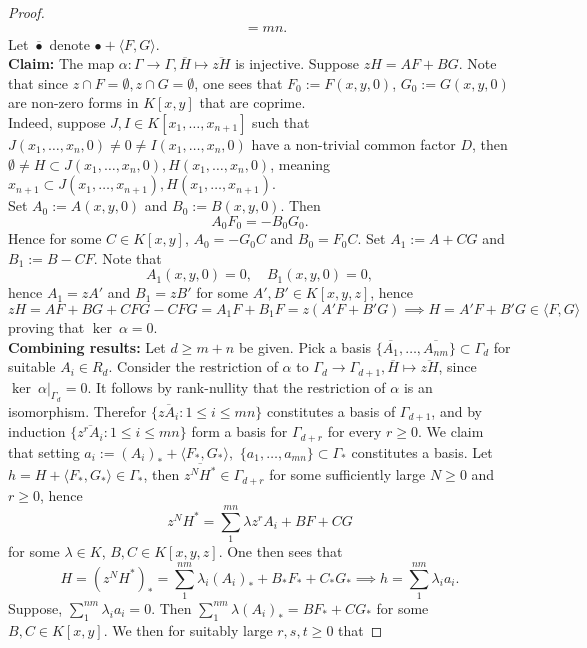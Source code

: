 \begin{proof}
\begin{align*}
            &= mn.
        \end{align*}
        Let $\overline{\bullet}$ denote $\bullet + \langle F,G\rangle$.\\
        \textbf{Claim:} The map $\alpha : \Gamma\rightarrow \Gamma, \overline{H} \mapsto \overline{zH}$ is injective. Suppose $zH=AF+BG$. Note that since $z\cap F = \emptyset,z\cap G = \emptyset$, one sees that $F_0:=F(x,y,0)$, $G_0:=G(x,y,0)$ are non-zero forms in $K[x,y]$ that are coprime.\\
        Indeed, suppose $J,I\in K[x_1,\dots,x_{n+1}]$ such that $J(x_1,\dots,x_n,0)\neq 0 \neq I(x_1,\dots,x_n,0)$ have a non-trivial common factor $D$, then $\emptyset\neq H\subset J(x_1,\dots,x_n,0),H(x_1,\dots,x_n,0)$, meaning $x_{n+1}\subset J(x_1,\dots,x_{n+1}),H(x_1,\dots,x_{n+1})$.\\
        Set $A_0:=A(x,y,0)$ and $B_0:= B(x,y,0)$. Then 
        $$A_0F_0 = -B_0G_0.$$
        Hence for some $C\in K[x,y]$, $A_0 = -G_0C$ and $B_0 = F_0C$. Set $A_1 := A+CG$ and $B_1 := B-CF$. Note that 
        $$A_1(x,y,0)=0, \quad B_1(x,y,0) = 0,$$
        hence $A_1= zA'$ and $B_1 = zB'$ for some $A',B'\in K[x,y,z]$, hence 
        $$zH= AF+BG+CFG-CFG = A_1F+B_1F = z(A'F+B'G)\implies H=A'F+B'G\in \langle F,G\rangle$$
        proving that $\ker\ \alpha = 0$.\\
        \textbf{Combining results:} Let $d\geq m+n$ be given. Pick a basis $\{\overline{A_1},\dots,\overline{A_{nm}}\}\subset \Gamma_d$ for suitable $A_i\in R_d$. Consider the restriction of $\alpha$ to $\Gamma_d \rightarrow \Gamma_{d+1}, \overline{H}\mapsto \overline{zH}$, since $\ker\ \left.\alpha\right|_{\Gamma_d} =0$. It follows by rank-nullity that the restriction of $\alpha$ is an isomorphism. Therefor $\{\overline{zA_i}:1\leq i\leq mn\}$ constitutes a basis of $\Gamma_{d+1}$, and by induction $\{\overline{z^rA_i}: 1\leq i\leq mn\}$ form a basis for $\Gamma_{d+r}$ for every $r\geq 0$. We claim that setting $a_i := (A_i)_\ast + \langle F_\ast,G_\ast\rangle,$ $\{a_1,\dots,a_{mn}\}\subset \Gamma_\ast$ constitutes a basis. Let $h = H + \langle F_\ast,G_\ast\rangle\in \Gamma_\ast$, then $\overline{z^NH^\ast}\in \Gamma_{d+r}$ for some sufficiently large $N\geq 0$ and $r\geq 0$, hence 
        $$z^NH^\ast = \sum_1^{mn} \lambda z^rA_i + BF+CG$$ for some $\lambda\in K$, $B,C\in K[x,y,z]$. One then sees that  
        $$H = (z^NH^\ast)_\ast = \sum_1^{nm} \lambda_i (A_i)_\ast+ B_\ast F_\ast+C_\ast G_\ast\implies h = \sum_1^{nm} \lambda_ia_i.$$
        Suppose, $\sum_1^{nm} \lambda_i a_i = 0$. Then $\sum_1^{nm} \lambda (A_i)_\ast = BF_\ast+CG_\ast$ for some $B,C\in K[x,y]$. We then for suitably large $r,s,t\geq0$ that

\end{proof}
